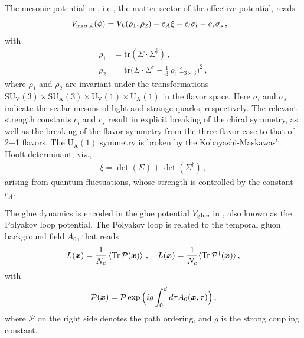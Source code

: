 \documentclass[aps,twocolumn,prd,superscriptaddress,nofootinbib,floatfix]{revtex4-2}
\newcommand{\Tr}{{\text{Tr}}}
\begin{document}
The mesonic potential in , i.e., the matter sector of the effective potential, reads
\begin{align}
    V_{\text{\tiny{matt}},k}(\phi)&=\tilde{V}_k(\rho_1,\rho_2)-c_A \xi-c_l\sigma_l-c_s\sigma_s\,, \label{eq:Vmatt}
\end{align}
with
\begin{align}
    \rho_1&=\text{tr}(\Sigma \cdot \Sigma^\dagger)\,, \label{eq:rho1}\\[2ex]
    \rho_2&=\text{tr}\Big(\Sigma \cdot \Sigma^\dagger-\frac{1}{3}\,\rho_1\,\mathbb{1}_{3\times 3}\Big)^2 \,,\label{eq:rho2}
\end{align}
where $\rho_1$ and $\rho_2$ are invariant under the transformations $\mathrm{SU}_{\mathrm{V}}(3)\times \mathrm{SU}_{\mathrm{A}}(3)\times \mathrm{U}_{\mathrm{V}}(1)\times \mathrm{U}_{\mathrm{A}}(1)$ in the flavor space. Here $\sigma_l$ and $\sigma_s$ indicate the scalar mesons of light and strange quarks, respectively. The relevant strength constants $c_l$ and $c_s$ result in explicit breaking of the chiral symmetry, as well as the breaking of the flavor symmetry from the three-flavor case to that of 2+1 flavors. The $\mathrm{U}_{\mathrm{A}}(1)$ symmetry is broken by the Kobayashi-Maskawa-'t Hooft determinant, viz.,
\begin{align}
    \xi=\det(\Sigma)+\det(\Sigma^\dagger)\,, \label{}
\end{align}
arising from quantum fluctuations, whose strength is controlled by the constant $c_A$.

The glue dynamics is encoded in the glue potential $V_{\mathrm{\tiny{glue}}}$ in , also known as the Polyakov loop potential. The Polyakov loop is related to the temporal gluon background field $A_0$, that reads
\begin{align}
  L(\bm{x})=\frac{1}{N_c} \left\langle \Tr\, {\cal P}(\bm x)\right\rangle \,,\quad  \bar L (\bm{x})=\frac{1}{N_c} \langle
  \Tr\,{\cal P}^{\dagger}(\bm x)\rangle \,,\label{eq:Lloop}
\end{align}
with 
\begin{align}
  {\cal P}(\bm x)= \mathcal{P}\exp\Big(ig\int_0^{\beta}d\tau A_0(\bm{x},\tau)\Big)\,,\label{eq:Ploop}
\end{align}
where $\mathcal{P}$ on the right side denotes the path ordering, and $g$ is the strong coupling constant.
\end{document}
